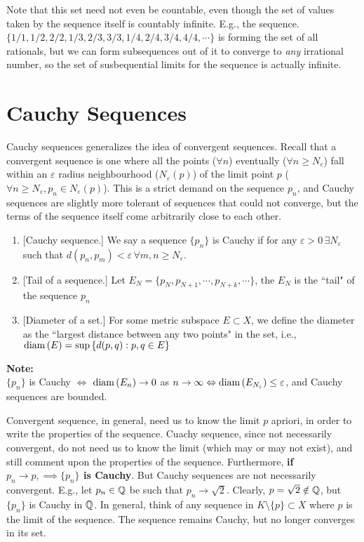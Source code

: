 Note that this set need not even be countable, even though the set of values taken by the sequence itself is countably infinite. E.g., the sequence. $\{1/1,1/2,2/2,1/3,2/3,3/3,1/4,2/4,3/4,4/4,\cdots\}$ is forming the set of all rationals, but we can form subsequences out of it to converge to \textit{any} irrational number, so the set of susbequential limits for the sequence is actually infinite.

\section{Cauchy Sequences}
Cauchy sequences generalizes the idea of convergent sequences. Recall that a convergent sequence is one where all the points ($\forall n$) eventually ($\forall n \geq N_\varepsilon$) fall within an $\varepsilon$ radius neighbourhood ($N_\varepsilon(p)$) of the limit point $p$ ($\forall n\geq N_\varepsilon, p_n\in N_\varepsilon(p)$). This is a strict demand on the sequence $p_n$, and Cauchy sequences are slightly more tolerant of sequences that could not converge, but the terms of the sequence itself come arbitrarily close to each other.
\begin{definition}
\begin{enumerate}
\item {[Cauchy sequence.]} We say a sequence $\{p_n\}$ is Cauchy if for any $\varepsilon >0\,\exists N_\varepsilon$ such that $d(p_n,p_m)<\varepsilon\,\forall m,n\geq N_\varepsilon$.
\item {[Tail of a sequence.]} Let $E_N=\{p_N,p_{N+1},\cdots,p_{N+k},\cdots\}$, the $E_N$ is the ``tail" of the sequence $p_n$
\item {[Diameter of a set.]} For some metric subspace $E\subset X$, we define the diameter as the ``largest distance between any two points" in the set, i.e., $\mathrm{diam}\left(E\right)=\sup{\{d(p,q):p,q\in E\}}$
\end{enumerate}
\end{definition}
\noindent \textbf{Note:}\\
$\{p_n\}$ is Cauchy $\iff$ $\mathrm{diam}\left(E_n\right)\to 0$ as $n\to \infty \Leftrightarrow \mathrm{diam}\left(E_{N_\varepsilon}\right)\leq \varepsilon$, and Cauchy sequences are bounded.

Convergent sequence, in general, need us to know the limit $p$ apriori, in order to write the properties of the sequence. Cuachy sequence, since not necessarily convergent, do not need us to know the limit (which may or may not exist), and still comment upon the properties of the sequence. Furthermore, \textbf{if $p_n\to p, \implies\{p_n\}$ is Cauchy}. But Cauchy sequences are not necessarily convergent. E.g., let $p_n\in\mathbb{Q}$ be such that $p_n\to \sqrt{2}$. Clearly, $p=\sqrt{2}\notin\mathbb{Q}$, but $\{p_n\}$  is Cauchy in $\mathbb{Q}$. In general, think of any sequence in $K\setminus\{p\}\subset X$ where $p$ is the limit of the sequence. The sequence remains Cauchy, but no longer converges in its set.

